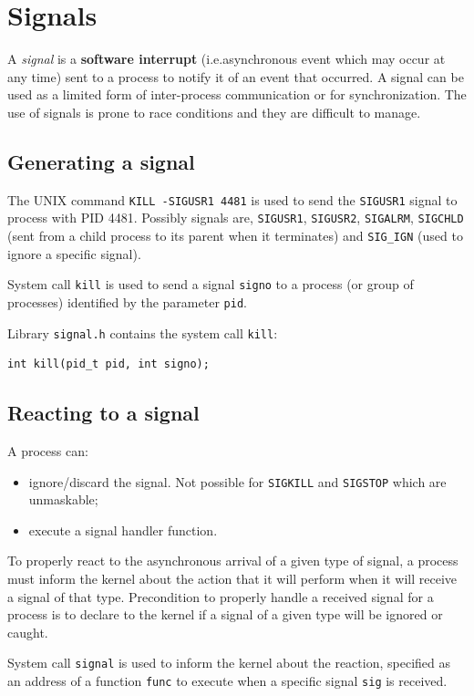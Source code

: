 \section{Signals}
A \emph{signal} is a \textbf{software interrupt} (i.e.\@ asynchronous event which may occur at any time) sent to a process to notify it of an event that occurred. A signal can be used as a limited form of inter-process communication or for synchronization. The use of signals is prone to race conditions and they are difficult to manage.

\subsection{Generating a signal}
The UNIX command \texttt{KILL -SIGUSR1 4481} is used to send the \texttt{SIGUSR1} signal to process with PID 4481. Possibly signals are, \texttt{SIGUSR1}, \texttt{SIGUSR2}, \texttt{SIGALRM}, \texttt{SIGCHLD} (sent from a child process to its parent when it terminates) and \texttt{SIG\_IGN} (used to ignore a specific signal).

System call \texttt{kill} is used to send a signal \texttt{signo} to a process (or group of processes) identified by the parameter \texttt{pid}.

Library \texttt{signal.h} contains the system call \texttt{kill}:
\begin{verbatim}
int kill(pid_t pid, int signo);
\end{verbatim}

\subsection{Reacting to a signal}
A process can:
\begin{itemize}
\item ignore/discard the signal. Not possible for \texttt{SIGKILL} and \texttt{SIGSTOP} which are unmaskable;
\item execute a signal handler function.
\end{itemize}
To properly react to the asynchronous arrival of a given type of signal, a process must inform the kernel about the action that it will perform when it will receive a signal of that type. Precondition to properly handle a received signal for a process is to declare to the kernel if a signal of a given type will be ignored or caught.

System call \texttt{signal} is used to inform the kernel about the reaction, specified as an address of a function \texttt{func} to execute when a specific signal \texttt{sig} is received.

